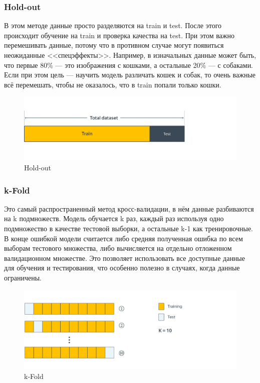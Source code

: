 \subsubsection{Hold-out}

В этом методе данные просто разделяются на train и test. После этого происходит обучение на train и проверка качества на test. При этом важно перемешивать данные, потому что в противном случае могут появиться неожиданные <<спецэффекты>>. Например, в изначальных данные может быть, что первые 80\% --- это изображения с кошками, а остальные 20\% --- с собаками. Если при этом цель --- научить модель различать кошек и собак, то очень важные всё перемешать, чтобы не оказалось, что в train попали только кошки.

\begin{figure}[h]
    \centering
    \includegraphics[width=\textwidth/2]{chapters/general/hold_out.png}
    \caption{Hold-out}
    \label{img:hold-out}
\end{figure}

\subsubsection{k-Fold}

Это самый распространенный метод кросс-валидации, в нём данные разбиваются на k подмножеств. Модель обучается k раз, каждый раз используя одно подмножество в качестве тестовой выборки, а остальные k-1 как тренировочные. В конце ошибкой модели считается либо средняя полученная ошибка по всем выборам тестового множества, либо вычисляется на отдельно отложенном валидационном множестве. Это позволяет использовать все доступные данные для обучения и тестирования, что особенно полезно в случаях, когда данные ограничены.

\begin{figure}[h]
    \centering
    \includegraphics[width=\textwidth/2]{chapters/general/k-fold.png}
    \caption{k-Fold}
    \label{img:k-fold}
\end{figure}

